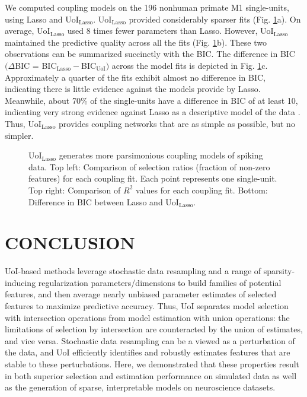 \documentclass[letterpaper, 10 pt, conference]{ieeeconf}  %
\begin{document}
We computed coupling models on the 196 nonhuman primate M1 single-units, using  Lasso and UoI$_{\text{Lasso}}$. UoI$_{\text{Lasso}}$ provided considerably sparser fits (Fig. \ref{fig:nhp}a). On average, UoI$_{\text{Lasso}}$ used 8 times fewer parameters than Lasso. However, UoI$_{\text{Lasso}}$ maintained the predictive quality across all the fits (Fig. \ref{fig:nhp}b). These two observations can be summarized succinctly with the BIC. The difference in BIC $(\Delta$BIC = BIC$_{\text{Lasso}}-$BIC$_{\text{UoI}})$ across the model fits is depicted in Fig. \ref{fig:nhp}c. Approximately a quarter of the fits exhibit almost no difference in BIC, indicating there is little evidence against the models provide by Lasso.  Meanwhile, about 70\% of the single-units have a difference in BIC of at least 10, indicating very strong evidence against Lasso as a descriptive model of the data \cite{kass1995}. Thus, UoI$_{\text{Lasso}}$ provides coupling networks that are as simple as possible, but no simpler. 
\begin{figure}[t]
    \centering
    \vspace{-15pt}
    \caption{UoI$_{\text{Lasso}}$ generates more parsimonious coupling models of spiking data. Top left: Comparison of selection ratios (fraction of non-zero features) for each coupling fit. Each point represents one single-unit. Top right: Comparison of $R^2$ values for each coupling fit. Bottom: Difference in BIC between Lasso and UoI$_{\text{Lasso}}$.}
    \label{fig:nhp}
\end{figure}

\section{CONCLUSION}

UoI-based methods leverage stochastic data resampling and a range of sparsity-inducing regularization parameters/dimensions to build families of potential features, and then average nearly unbiased parameter estimates of selected features to maximize predictive accuracy. Thus, UoI separates model selection with intersection operations from model estimation with union operations: the limitations of selection by intersection are counteracted by the union of estimates, and vice versa. Stochastic data resampling can be a viewed as a perturbation of the data, and UoI efficiently identifies and robustly estimates features that are stable to these perturbations. Here, we demonstrated that these properties result in both superior selection and estimation performance on simulated data as well as the generation of sparse, interpretable models on neuroscience datasets.
\end{document}
